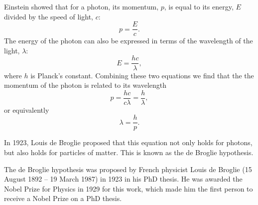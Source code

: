 Einstein showed that for a photon, its momentum, $p$, is equal to its energy, $E$ divided by the speed of light, $c$:
$$p=\frac{E}{c}.$$
The energy of the photon can also be expressed in terms of the wavelength of the light, $\lambda$:
$$E=\frac{hc}{\lambda},$$
where $h$ is Planck's constant. Combining these two equations we find that the the momentum of the photon is related to its wavelength
$$p=\frac{hc}{c\lambda}=\frac{h}{\lambda},$$
or equivalently
$$\lambda=\frac{h}{p}.$$

In 1923, Louis de Broglie proposed that this equation not only holds for photons, but also holds for  particles of matter. This is known as the de Broglie hypothesis.
 


\begin{IFact}
{The de Broglie hypothesis was proposed by French physicist Louis de Broglie (15 August 1892 -- 19 March 1987) in 1923 in his PhD thesis. He was awarded the Nobel Prize for Physics in 1929 for this work, which made him the first person to receive a Nobel Prize on a PhD thesis.}
\end{IFact}

\vspace{2cm}

